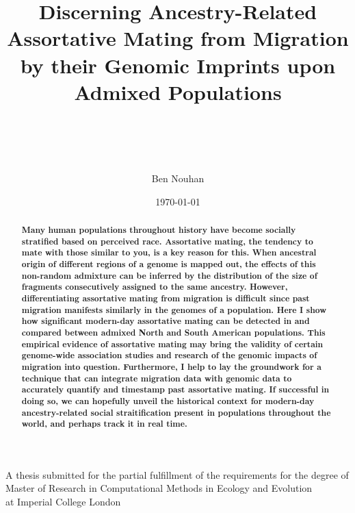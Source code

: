 \documentclass[11pt]{article}
\title{Discerning Ancestry-Related Assortative Mating from Migration by their Genomic Imprints upon Admixed Populations}
\author{\\ \\ \\ \\ Ben Nouhan}
\date{\today}
\begin{document}
\maketitle
\vspace{15mm}


\begin{center}
\small{A thesis submitted for the partial fulfillment of the requirements for the degree of Master of Research in Computational Methods in Ecology and Evolution \\ at Imperial College London}
\end{center} 


\vspace{15mm}
\onehalfspacing
\renewcommand{\abstractname}{\vspace{-\baselineskip}} %
\begin{abstract}
    \linenumbers
    \small
    \noindent
    \textbf{
        Many human populations throughout history have become socially stratified based on perceived race. Assortative mating, the tendency to mate with those similar to you, is a key reason for this. When ancestral origin of different regions of a genome is mapped out, the effects of this non-random admixture can be inferred by the distribution of the size of fragments consecutively assigned to the same ancestry. However, differentiating assortative mating from migration is difficult since past migration manifests similarly in the genomes of a population. Here I show how significant modern-day assortative mating can be detected in and compared between admixed North and South American populations. This empirical evidence of assortative mating may bring the validity of certain genome-wide association studies and research of the genomic impacts of migration into question. Furthermore, I help to lay the groundwork for a technique that can integrate migration data with genomic data to accurately quantify and timestamp past assortative mating. If successful in doing so, we can hopefully unveil the historical context for modern-day ancestry-related social straitification present in populations throughout the world, and perhaps track it in real time.
    }
\end{abstract}



\end{document}
